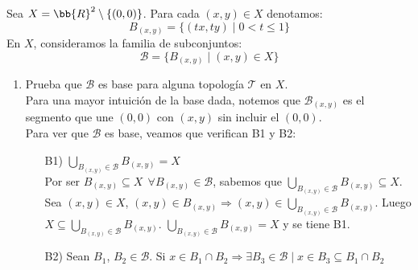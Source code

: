 \documentclass[12pt]{article}
\newcounter{ejercicio}[section] %
\newcounter{ejercicio}
\begin{document}
    \begin{ejercicio}[4.5 puntos]
        Sea $X = \bb{R}^2 \setminus \{(0,0)\}$. Para cada $(x,y) \in X$ denotamos:
        $$B_{(x,y)} = \{(tx, ty) \mid 0 < t \leq 1 \}$$
        En $X$, consideramos la familia de subconjuntos:
        $$\mathcal{B} = \{B_{(x,y)} \mid (x,y) \in X\}$$
        \begin{enumerate}[label=(\alph*)]
            \item Prueba que $\mathcal{B}$ es base para alguna topología $\mathcal{T}$ en $X$.\\

                \noindent
                Para una mayor intuición de la base dada, notemos que $\mathcal{B}_{(x,y)}$ es el segmento que une $(0,0)$ con $(x,y)$ sin incluir el $(0,0)$.\\

                \noindent
                Para ver que $\mathcal{B}$ es base, veamos que verifican B1 y B2:
                \begin{enumerate}
                    \item[B1)] $\displaystyle \bigcup_{B_{(x,y)} \in \mathcal{B}} B_{(x,y)} = X$\\

                        \noindent
                        Por ser $B_{(x,y)} \subseteq X ~~\forall B_{(x,y)} \in \mathcal{B}$, sabemos que $\displaystyle \bigcup_{B_{(x,y)} \in \mathcal{B}} B_{(x,y)} \subseteq X$.\newline
                        Sea $(x,y) \in X$, $(x,y) \in B_{(x,y)} \Rightarrow (x,y) \in \displaystyle \bigcup_{B_{(x,y)} \in \mathcal{B}} B_{(x,y)}$.\newline
                        Luego $X \subseteq \displaystyle \bigcup_{B_{(x,y)} \in \mathcal{B}} B_{(x,y)}$.\newline
                        $\displaystyle \bigcup_{B_{(x,y)} \in \mathcal{B}} B_{(x,y)} = X$ y se tiene B1.
                    \item[B2)] Sean $B_1$, $B_2 \in \mathcal{B}$. Si $x \in B_1 \cap B_2 \Rightarrow \exists B_3 \in \mathcal{B} \mid x \in B_3 \subseteq B_1 \cap B_2$\\


\end{enumerate}
\end{enumerate}
\end{ejercicio}
\end{document}
